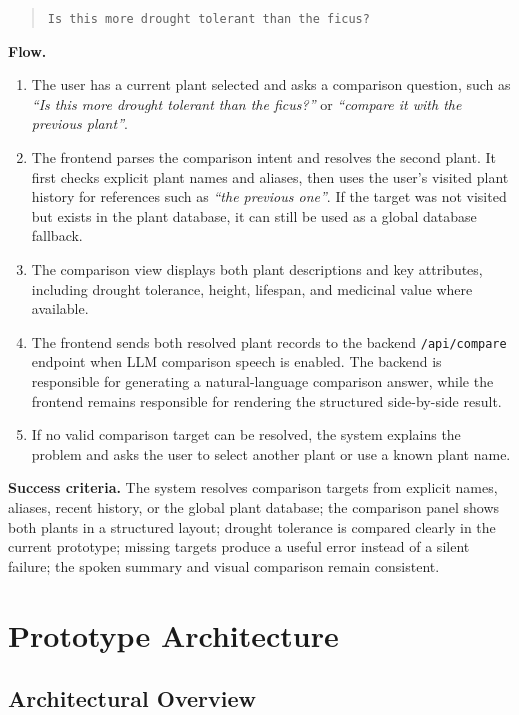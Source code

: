 \documentclass[12pt,a4paper]{article}
\newcommand{\tasksub}[1]{\par\smallskip\noindent\textbf{#1}\quad\ignorespaces}
\begin{document}
\begin{quote}
\texttt{Is this more drought tolerant than the ficus?}
\end{quote}

\tasksub{Flow.}
\begin{enumerate}
    \item The user has a current plant selected and asks a comparison question,
    such as \emph{``Is this more drought tolerant than the ficus?''} or
    \emph{``compare it with the previous plant''}.
    \item The frontend parses the comparison intent and resolves the second
    plant. It first checks explicit plant names and aliases, then uses the
    user's visited plant history for references such as \emph{``the previous
    one''}. If the target was not visited but exists in the plant database, it
    can still be used as a global database fallback.
    \item The comparison view displays both plant descriptions and key
    attributes, including drought tolerance, height, lifespan, and medicinal
    value where available.
    \item The frontend sends both resolved plant records to the backend
    \texttt{/api/compare} endpoint when LLM comparison speech is enabled.
    The backend is responsible for generating a natural-language comparison
    answer, while the frontend remains responsible for rendering the
    structured side-by-side result.
    \item If no valid comparison target can be resolved, the system explains
    the problem and asks the user to select another plant or use a known plant
    name.
\end{enumerate}

\tasksub{Success criteria.} The system resolves comparison targets from
explicit names, aliases, recent history, or the global plant database; the
comparison panel shows both plants in a structured layout; drought tolerance
is compared clearly in the current prototype; missing targets produce a useful
error instead of a silent failure; the spoken summary and visual comparison
remain consistent.

\section{Prototype Architecture}
\subsection{Architectural Overview}
\end{document}
